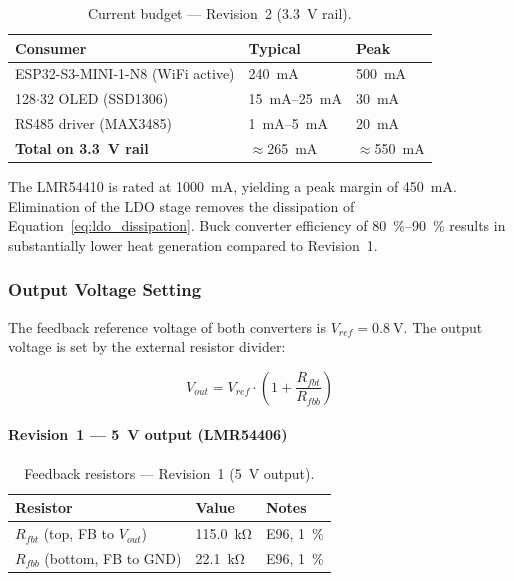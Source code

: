 \begin{table}[H]
  \caption{Current budget — Revision~2 (\SI{3.3}{\volt} rail).}
  \label{tab:current_rev2}
  \centering
  \begin{tabularx}{\textwidth}{|X|X|X|}
    \hline
    \textbf{Consumer} & \textbf{Typical} & \textbf{Peak} \\ \hline \hline
    ESP32-S3-MINI-1-N8 (\ac{WiFi} active) & \SI{240}{\milli\ampere} & \SI{500}{\milli\ampere} \\ \hline
    128$\cdot$32 \ac{OLED} (SSD1306)  & \SI{15}{\milli\ampere}--\SI{25}{\milli\ampere} & \SI{30}{\milli\ampere} \\ \hline
    \ac{RS485} driver (MAX3485)         & \SI{1}{\milli\ampere}--\SI{5}{\milli\ampere}   & \SI{20}{\milli\ampere} \\ \hline
    \hline
    \textbf{Total on \SI{3.3}{\volt} rail} & $\approx$\SI{265}{\milli\ampere} & $\approx$\SI{550}{\milli\ampere} \\ \hline
  \end{tabularx}
\end{table}

The LMR54410 is rated at \SI{1000}{\milli\ampere}, yielding a peak margin of \SI{450}{\milli\ampere}.
Elimination of the \ac{LDO} stage removes the dissipation of Equation~\eqref{eq:ldo_dissipation}.
Buck converter efficiency of \SI{80}{\percent}--\SI{90}{\percent} results in substantially lower heat generation compared to Revision~1.

\subsubsection{Output Voltage Setting}
\label{sec:output_voltage}

The feedback reference voltage of both converters is $V_{ref} = \SI{0.8}{\volt}$.
The output voltage is set by the external resistor divider:

\begin{equation}
  V_{out} = V_{ref} \cdot \left(1 + \frac{R_{fbt}}{R_{fbb}}\right)
  \label{eq:vout}
\end{equation}

\paragraph{Revision~1 — \SI{5}{\volt} output (LMR54406)}

\begin{table}[H]
  \caption{Feedback resistors — Revision~1 (\SI{5}{\volt} output).}
  \label{tab:fb_rev1}
  \centering
  \begin{tabularx}{\textwidth}{|X|X|X|}
    \hline
    \textbf{Resistor} & \textbf{Value} & \textbf{Notes} \\ \hline \hline
    $R_{fbt}$ (top, FB to $V_{out}$) & \SI{115.0}{\kilo\ohm} & E96, \SI{1}{\percent} \\ \hline
    $R_{fbb}$ (bottom, FB to GND)    & \SI{22.1}{\kilo\ohm}  & E96, \SI{1}{\percent} \\ \hline
  \end{tabularx}
\end{table}

